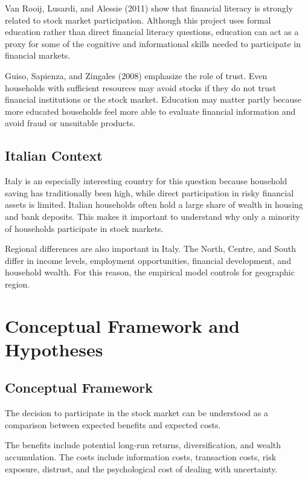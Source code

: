 \documentclass[12pt]{article}
\begin{document}
Van Rooij, Lusardi, and Alessie (2011) show that financial literacy is strongly related to stock market participation. Although this project uses formal education rather than direct financial literacy questions, education can act as a proxy for some of the cognitive and informational skills needed to participate in financial markets.

Guiso, Sapienza, and Zingales (2008) emphasize the role of trust. Even households with sufficient resources may avoid stocks if they do not trust financial institutions or the stock market. Education may matter partly because more educated households feel more able to evaluate financial information and avoid fraud or unsuitable products.

\subsection{Italian Context}

Italy is an especially interesting country for this question because household saving has traditionally been high, while direct participation in risky financial assets is limited. Italian households often hold a large share of wealth in housing and bank deposits. This makes it important to understand why only a minority of households participate in stock markets.

Regional differences are also important in Italy. The North, Centre, and South differ in income levels, employment opportunities, financial development, and household wealth. For this reason, the empirical model controls for geographic region.

\section{Conceptual Framework and Hypotheses}

\subsection{Conceptual Framework}

The decision to participate in the stock market can be understood as a comparison between expected benefits and expected costs.

The benefits include potential long-run returns, diversification, and wealth accumulation. The costs include information costs, transaction costs, risk exposure, distrust, and the psychological cost of dealing with uncertainty.
\end{document}
